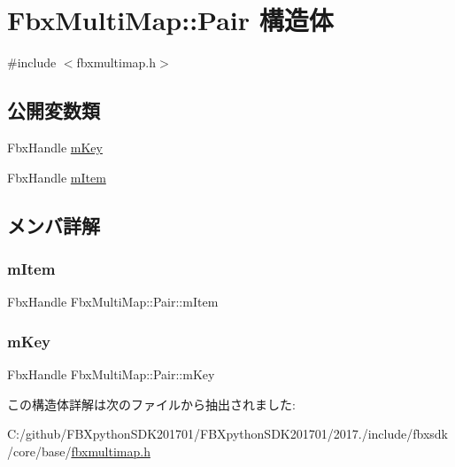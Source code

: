 \hypertarget{struct_fbx_multi_map_1_1_pair}{}\section{Fbx\+Multi\+Map\+:\+:Pair 構造体}
\label{struct_fbx_multi_map_1_1_pair}


{\ttfamily \#include $<$fbxmultimap.\+h$>$}

\subsection*{公開変数類}
\begin{DoxyCompactItemize}
\item 
Fbx\+Handle \hyperlink{struct_fbx_multi_map_1_1_pair_a1f27833009f19a3416efb50bc74c9e3e}{m\+Key}
\item 
Fbx\+Handle \hyperlink{struct_fbx_multi_map_1_1_pair_a7754a75906a6dbf593cfe25f235e28b4}{m\+Item}
\end{DoxyCompactItemize}


\subsection{メンバ詳解}
\mbox{\label{struct_fbx_multi_map_1_1_pair_a7754a75906a6dbf593cfe25f235e28b4}} 
\subsubsection{\texorpdfstring{m\+Item}{mItem}}
{\footnotesize\ttfamily Fbx\+Handle Fbx\+Multi\+Map\+::\+Pair\+::m\+Item}

\mbox{\label{struct_fbx_multi_map_1_1_pair_a1f27833009f19a3416efb50bc74c9e3e}} 
\subsubsection{\texorpdfstring{m\+Key}{mKey}}
{\footnotesize\ttfamily Fbx\+Handle Fbx\+Multi\+Map\+::\+Pair\+::m\+Key}



この構造体詳解は次のファイルから抽出されました\+:\begin{DoxyCompactItemize}
\item 
C\+:/github/\+F\+B\+Xpython\+S\+D\+K201701/\+F\+B\+Xpython\+S\+D\+K201701/2017./include/fbxsdk/core/base/\hyperlink{fbxmultimap_8h}{fbxmultimap.\+h}\end{DoxyCompactItemize}
